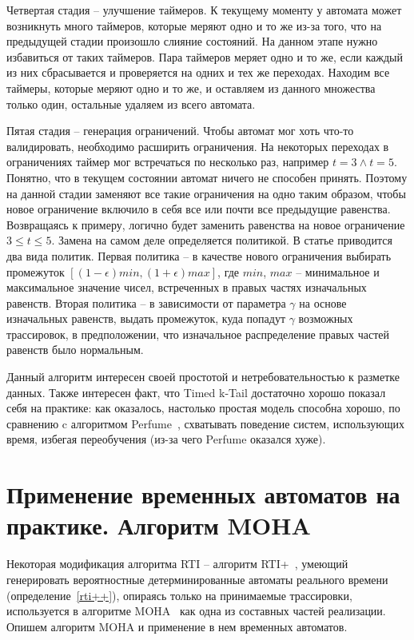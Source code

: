 \documentclass[times,specification,annotation]{itmo-student-thesis}
\begin{document}
Четвертая стадия -- улучшение таймеров. К текущему моменту у автомата может возникнуть много таймеров, которые меряют одно и то же из-за того, что на предыдущей стадии произошло слияние состояний.
На данном этапе нужно избавиться от таких таймеров. Пара таймеров меряет одно и то же, если каждый из них сбрасывается и проверяется на одних и тех же переходах. Находим все таймеры, которые меряют
одно и то же, и оставляем из данного множества только один, остальные удаляем из всего автомата.

Пятая стадия -- генерация ограничений. Чтобы автомат мог хоть что-то валидировать, необходимо расширить ограничения. На некоторых переходах в ограничениях таймер мог встречаться по несколько раз, 
например $t = 3 \land t = 5$. Понятно, что в текущем состоянии автомат ничего не способен принять. Поэтому на данной стадии заменяют все такие ограничения на одно таким образом, чтобы новое ограничение
включило в себя все или почти все предыдущие равенства. Возвращаясь к примеру, логично будет заменить равенства на новое ограничение $3 \leq t \leq 5$. Замена на самом деле определяется политикой.
В статье приводится два вида политик. Первая политика -- в качестве нового ограничения выбирать промежуток $[(1-\epsilon)min, (1+\epsilon)max]$, где $min$, $max$ -- минимальное
и максимальное значение чисел, встреченных в правых частях изначальных равенств. Вторая политика -- в зависимости от параметра $\gamma$
на основе изначальных равенств, выдать промежуток, куда попадут $\gamma$ возможных трассировок, в предположении, что изначальное распределение правых частей равенств было нормальным.

Данный алгоритм интересен своей простотой и нетребовательностью к разметке данных. Также интересен факт, что Timed k-Tail достаточно хорошо показал себя на практике: как оказалось, настолько
простая модель способна хорошо, по сравнению c алгоритмом Perfume~\cite{perfume}, схватывать поведение систем, использующих время, избегая переобучения (из-за чего Perfume оказался хуже).

\section{Применение временных автоматов на практике. Алгоритм MOHA}

Некоторая модификация алгоритма RTI -- алгоритм RTI+~\cite{rti+}, умеющий генерировать вероятностные детерминированные автоматы реального времени (определение~\ref{rti++}),
опираясь только на принимаемые трассировки, используется в алгоритме MOHA~\cite{moha} как одна из составных частей реализации. Опишем алгоритм MOHA и применение в нем временных автоматов.
\end{document}
